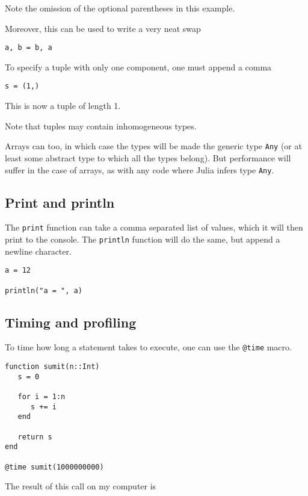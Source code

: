 \documentclass[a4paper,10pt]{article}
\newcommand{\code}{\lstinline}
\begin{document}
{Note the omission of the optional parentheses in this example.

Moreover, this can be used to write a very neat swap

\begin{lstlisting}
a, b = b, a
\end{lstlisting}

To specify a tuple with only one component, one must append a comma

\begin{lstlisting}
s = (1,)
\end{lstlisting}

This is now a tuple of length 1.

Note that tuples may contain inhomogeneous types. 

Arrays can too, in which case the types will be made the generic type \code{Any} (or
at least some abstract type to which all the types belong). 
But performance will suffer in the case of arrays, as with any code where Julia infers
type \code{Any}.

\subsection{Print and println}

The \code{print} function can take a comma separated list of values, which it will
then print to the console. The \code{println} function will do the same, but append
a newline character.

\begin{lstlisting}
a = 12

println("a = ", a)
\end{lstlisting}

\subsection{Timing and profiling}

To time how long a statement takes to execute, one can use the \code{@time} macro.

\begin{lstlisting}
function sumit(n::Int)
   s = 0

   for i = 1:n
      s += i
   end

   return s
end

@time sumit(1000000000)
\end{lstlisting}

The result of this call on my computer is

}
\end{document}
